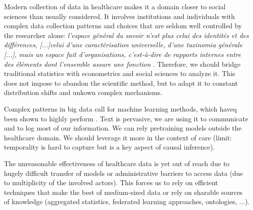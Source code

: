 \documentclass{report}
\begin{document}
Modern collection of data in healthcare makes it a domain closer to social
sciences than usually considered. It involves institutions and individuals with
complex data collection patterns and choices that are seldom well controlled by
the researcher alone: \textit{l'espace général du savoir n'est plus celui des
identités et des différences, [...]celui d'une caractérisation universelle,
d'une taxinomia générale [...], mais un espace fait d'organisations,
c'est-à-dire de rapports internes entre des éléments dont l'ensemble assure une
fonction} \citep{foucault1990mots}. Therefore, we should bridge traditional
statistics with econometrics and social sciences to analyze it. This does not
impose to abandon the scientific method, but to adapt it to constant
distribution shifts and unkown complex mechanisms.

Complex patterns in big data call for machine learning methods, which haveq been shown to
highly perform . Text is pervasive, we are using it to communicate and to log
most of our information. We can rely pretraining models outside the healthcare
domain. We should leverage it more in the context of care (limit: temporality is
hard to capture but is a key aspect of causal inference).

The unreasonable effectiveness of healthcare data is yet out of reach due to
hugely difficult transfer of models or administrative barriers to access data
(due to multiplicity of the involved actors). This forces us to rely on
efficient techniques that make the best of medium-sized data or rely on sharable
sources of knowledge (aggregated statistics, federated learning approaches,
ontologies, ...).

\printbibliography
\end{document}

